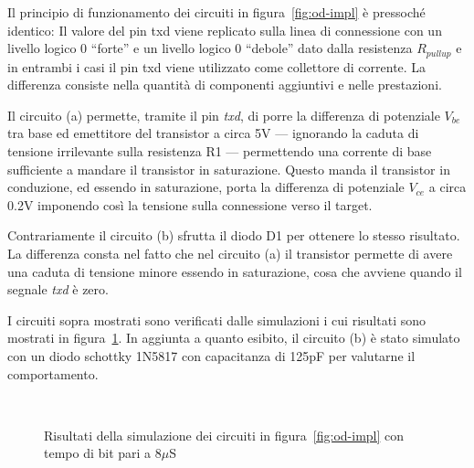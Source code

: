 Il principio di funzionamento dei circuiti in figura~\ref{fig:od-impl} è pressoché identico: Il valore del pin txd viene replicato sulla linea di connessione con un livello logico 0 ``forte'' e un livello logico 0 ``debole'' dato dalla resistenza \(R_{pullup}\) e in entrambi i casi il pin txd viene utilizzato come collettore di corrente.
La differenza consiste nella quantità di componenti aggiuntivi e nelle prestazioni.

Il circuito (a) permette, tramite il pin \textit{txd}, di porre la differenza di potenziale \(V_{be}\) tra base ed emettitore del transistor a circa 5V --- ignorando la caduta di tensione irrilevante sulla resistenza R1 --- permettendo una corrente di base sufficiente a mandare il transistor in saturazione. Questo manda il transistor in conduzione, ed essendo in saturazione, porta la differenza di potenziale \(V_{ce}\) a circa 0.2V imponendo così la tensione sulla connessione verso il target.

Contrariamente il circuito (b) sfrutta il diodo D1 per ottenere lo stesso risultato. La differenza consta nel fatto che nel circuito (a) il transistor permette di avere una caduta di tensione minore essendo in saturazione, cosa che avviene quando il segnale \textit{txd} è zero.

I circuiti sopra mostrati sono verificati dalle simulazioni i cui risultati sono mostrati in figura~\ref{graph:sim}. In aggiunta a quanto esibito, il circuito (b) è stato simulato con un diodo schottky 1N5817 con capacitanza di 125pF per valutarne il comportamento.

\begin{figure}
    \centering
        \\
        \vfill
    \caption[]{Risultati della simulazione dei circuiti in figura~\ref{fig:od-impl} con tempo di bit pari a 8\(\mu\)S}\label{graph:sim}
\end{figure}

